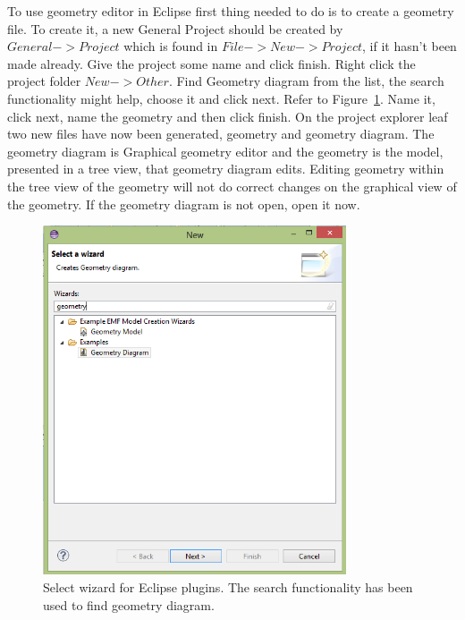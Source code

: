 To use geometry editor in Eclipse first thing needed to do is to create a geometry file. To create it, a new General Project should be created by $General->Project$ which is found in $File->New->Project$, if it hasn't been made already. Give the project some name and click finish. 
Right click the project folder $New->Other$. Find Geometry diagram from the list, the search functionality might help, choose it and click next. Refer to Figure~\ref{fig:ge-wiz-select}. Name it, click next, name the geometry and then click finish. On the project explorer leaf two new files have now been generated, geometry and geometry diagram. The geometry diagram is Graphical geometry editor and the geometry is the model, presented in a tree view, that geometry diagram edits. Editing geometry within the tree view of the geometry will not do correct changes on the graphical view of the geometry. If the geometry diagram is not open, open it now.

\begin{figure}[htp]
\begin{center}
  \includegraphics[width=0.8\textwidth]{image/ge-wiz-select.png}
  \caption{Select wizard for Eclipse plugins. The search functionality has been used to find geometry diagram.}
  \label{fig:ge-wiz-select}
\end{center}
\end{figure}

